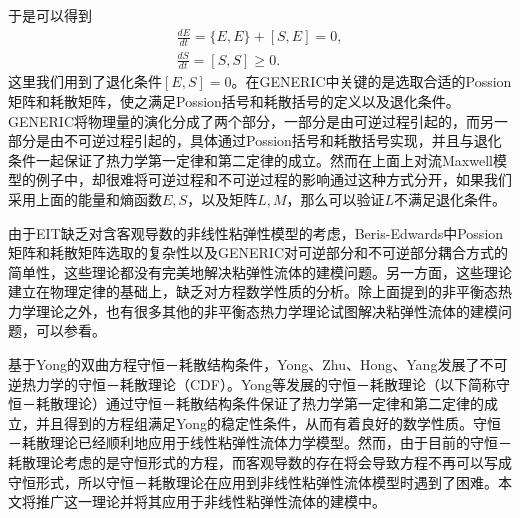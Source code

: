 于是可以得到
\begin{eqnarray*}
	\frac{d E}{dt} = \{E,E\} +[S,E] = 0, \\
	\frac{d S}{dt} = [S,S] \ge 0. 
\end{eqnarray*}
这里我们用到了退化条件$[E,S] = 0$。在GENERIC中关键的是选取合适的Possion矩阵和耗散矩阵，使之满足Possion括号和耗散括号的定义以及退化条件。GENERIC将物理量的演化分成了两个部分，一部分是由可逆过程引起的，而另一部分是由不可逆过程引起的，具体通过Possion括号和耗散括号实现，并且与退化条件一起保证了热力学第一定律和第二定律的成立。然而在上面上对流Maxwell模型的例子中，却很难将可逆过程和不可逆过程的影响通过这种方式分开，如果我们采用上面的能量和熵函数$E,S$，以及矩阵$L,M$，那么可以验证$L$不满足退化条件。  

由于EIT缺乏对含客观导数的非线性粘弹性模型的考虑，Beris-Edwards中Possion矩阵和耗散矩阵选取的复杂性以及GENERIC对可逆部分和不可逆部分耦合方式的简单性，这些理论都没有完美地解决粘弹性流体的建模问题。另一方面，这些理论建立在物理定律的基础上，缺乏对方程数学性质的分析。除上面提到的非平衡态热力学理论之外，也有很多其他的非平衡态热力学理论试图解决粘弹性流体的建模问题，可以参看\cite{stratonovich2012nonlinear,huo1993nonequilibrium,eu1992kinetic}。

基于Yong的双曲方程守恒－耗散结构条件\cite{yong2008interesting}，Yong、Zhu、Hong、Yang发展了不可逆热力学的守恒－耗散理论（CDF）\cite{zhu2014conservation}。Yong等发展的守恒－耗散理论（以下简称守恒－耗散理论）通过守恒－耗散结构条件保证了热力学第一定律和第二定律的成立，并且得到的方程组满足Yong的稳定性条件，从而有着良好的数学性质\cite{yong1992singular}。守恒－耗散理论已经顺利地应用于线性粘弹性流体力学模型\cite{zhu2014conservation}。然而，由于目前的守恒－耗散理论考虑的是守恒形式的方程，而客观导数的存在将会导致方程不再可以写成守恒形式，所以守恒－耗散理论在应用到非线性粘弹性流体模型时遇到了困难。本文将推广这一理论并将其应用于非线性粘弹性流体的建模中。

